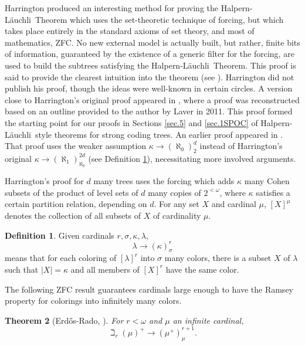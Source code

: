\documentclass{amsart}
\newtheorem{thm}{Theorem}[section]
\theoremstyle{remark}
\theoremstyle{definition}
\newtheorem{defn}[thm]{Definition}
\theoremstyle{remark}
\newcommand{\om}{\omega}
\newcommand{\ra}{\rightarrow}
\newcommand{\Erdos}{Erd{\H{o}}s}
\newcommand{\Lauchli}{L{\"{a}}uchli}
\begin{document}
Harrington   produced   an interesting method for proving the Halpern-\Lauchli\ Theorem which uses the set-theoretic technique of forcing, but which takes place entirely  in the standard axioms of set theory, and most of mathematics, ZFC.
No  new external  model is actually built, but rather, finite  bits of information,  guaranteed by the existence of a  generic filter for the forcing, are
used to build the subtrees satisfying the Halpern-\Lauchli\ Theorem.
This proof is said to provide the clearest  intuition into the theorem (see \cite{TodorcevicBK10}).
Harrington did not publish his proof,  though the ideas were well-known
in certain circles.
A version  close to Harrington's original proof appeared in  \cite{DobrinenRIMS17}, where a   proof  was reconstructed based on an outline provided to the author by Laver in 2011.
This  proof
 formed the starting point for our proofs in
 Sections \ref{sec.5}  and
\ref{sec.1SPOC} of Halpern-\Lauchli\ style theorems for strong coding trees.
An earlier proof appeared in \cite{Farah/TodorcevicBK}.
That proof uses the  weaker assumption $\kappa\ra (\aleph_0)^d_2$ instead of Harrington's original $\kappa\ra (\aleph_1)^{2d}_{\aleph_0}$ (see Definition \ref{defn.arrownotation}), necessitating more involved arguments. 




Harrington's  proof for $d$ many trees uses the forcing which adds $\kappa$ many Cohen subsets of the product of level sets of $d$ many copies of $2^{<\om}$,
where $\kappa$ satisfies a certain partition relation, depending on $d$.
For any set $X$ and cardinal $\mu$, $[X]^{\mu}$ denotes the collection of all subsets of $X$ of cardinality $\mu$.


\begin{defn}\label{defn.arrownotation}
Given cardinals $r,\sigma,\kappa,\lambda$,
\begin{equation}
\lambda\ra(\kappa)^r_{\sigma}
\end{equation}
means that for each coloring of $[\lambda]^r$ into $\sigma$ many colors,
there is a subset $X$ of $\lambda$ such that $|X|=\kappa$ and all members of $[X]^r$ have the same color.
\end{defn}


The following  ZFC result guarantees cardinals large enough to have the Ramsey property for colorings into infinitely many colors.


\begin{thm}[\Erdos-Rado, \cite{Erdos/Rado56}]\label{thm.ER}
For $r<\om$ and $\mu$ an infinite cardinal,
$$
\beth_r(\mu)^+\ra(\mu^+)_{\mu}^{r+1}.
$$
\end{thm}
\end{document}
